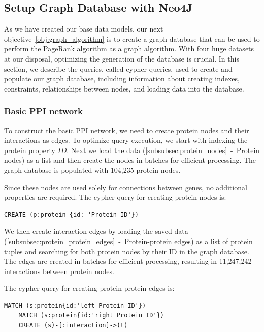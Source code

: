 \subsection{Setup Graph Database with Neo4J} \label{subsec:graph_database}

As we have created our base data models, our next objective~\ref{obj:graph_algorithm} is to create a graph database
that can be used to perform the PageRank algorithm as a graph algorithm.
With four huge datasets at our disposal, optimizing the generation of the database is crucial.
In this section, we describe the queries, called cypher queries, used to create and populate our graph database,
including information about creating indexes, constraints, relationships between nodes, and loading data into the database.\\


\subsubsection*{Basic PPI network} \label{subsubsec:basic_ppi_network}
To construct the basic PPI network, we need to create protein nodes and their interactions as edges.
To optimize query execution, we start with indexing the protein property $ID$.
Next we load the data (\cref{subsubsec:protein_nodes}~-~Protein nodes) as a list and then create the nodes in batches for efficient processing.
The graph database is populated with 104,235 protein nodes.

Since these nodes are used solely for connections between genes, no additional properties are required.
The cypher query for creating protein nodes is:
\begin{lstlisting}[language=Cypher, label={lst:protein_nodes}]
    CREATE (p:protein {id: 'Protein ID'})
\end{lstlisting}
\vspace{\baselineskip}

We then create interaction edges by loading the saved data (\cref{subsubsec:protein_protein_edges}~-~Protein-protein edges)
as a list of protein tuples and searching for both protein nodes by their ID in the graph database.
The edges are created in batches for efficient processing, resulting in 11,247,242 interactions between protein nodes.

The cypher query for creating protein-protein edges is:
\begin{lstlisting}[language=Cypher, label={lst:protein_edges}]
    MATCH (s:protein{id:'left Protein ID'})
    MATCH (s:protein{id:'right Protein ID'})
    CREATE (s)-[:interaction]->(t)
\end{lstlisting}

